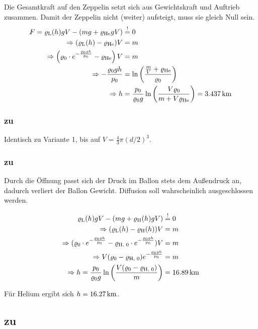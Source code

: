 \documentclass[a4paper]{scrartcl}
\begin{document}
Die Gesamtkraft auf den Zeppelin setzt sich aus Gewichtskraft und Auftrieb zusammen. Damit der Zeppelin nicht (weiter) aufsteigt, muss sie gleich Null sein.
\begin{align*}
  F = \varrho_\text{L}(h) gV - (mg + \varrho_\text{He}gV) & \stackrel{!}{=} 0 \\
  \Rightarrow (\varrho_\text{L}(h) - \varrho_\text{He}) V &= m \\
  \Rightarrow \left( \varrho_0 \cdot  e^{-\frac{\varrho_0gh}{p_0}} -\varrho_\text{He} \right)V &= m\\
  \Rightarrow -\frac{\varrho_0gh}{p_0} &= \ln \left( \frac{\frac{m}{V}+\varrho_\text{He}}{\varrho_0} \right) \\
  \Rightarrow h &= \frac{p_0}{\varrho_0g} \ln \left( \frac{V\varrho_0}{m+V\varrho_\text{He}} \right) = \unit[3.437]{km}
\end{align*}


\subsubsection{zu }
\label{lsg:Zeppelin2}
Identisch zu Variante 1, bis auf $V = \frac{4}{3}\pi (d/2)^3$.

\subsubsection{zu }
\label{lsg:Zeppelin3}
Durch die Öffnung passt sich der Druck im Ballon stets dem Außendruck an, dadurch verliert der Ballon Gewicht. Diffusion soll wahrscheinlich ausgeschlossen werden.

\begin{align*}
  \varrho_\text{L}(h)gV - (mg + \varrho_\text{H}(h)gV) & \stackrel!= 0 \\
  \Rightarrow (\varrho_\text{L}(h) -\varrho_\text{H}(h))V &= m \\
  \Rightarrow (\varrho_0 \cdot e^{-\frac{\varrho_0gh}{p_0}} - \varrho_\text{H, 0} \cdot e^{-\frac{\varrho_0gh}{p_0}})V &= m \\
  \Rightarrow V(\varrho_0 - \varrho_\text{H, 0}) e^{-\frac{\varrho_0gh}{p_0}} &= m \\
  \Rightarrow h = \frac{p_0}{\varrho_0g} \ln \left( \frac{V(\varrho_0 - \varrho_\text{H, 0})}{m} \right) &= \unit[16.89]{km}
\end{align*}

Für Helium ergibt sich $h = \unit[16.27]{km}$.

\subsection{zu }
\label{lsg:Spannungsteiler}
\end{document}
